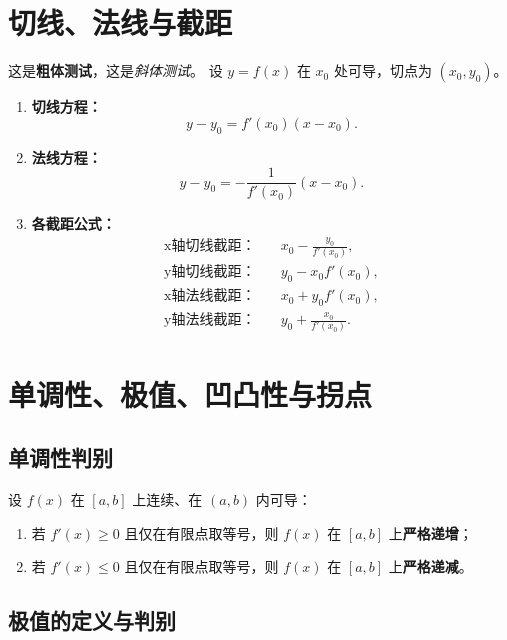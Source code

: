 
\section{切线、法线与截距}
\DTwoTwo
这是\textbf{粗体测试}，这是\textit{斜体测试}。
设 $y = f(x)$ 在 $x_0$ 处可导，切点为 $(x_0, y_0)$。

\begin{enumerate}
    \item \textbf{切线方程：}
          \[
              y - y_0 = f'(x_0)(x - x_0).
          \]
    \item \textbf{法线方程：}
          \[
              y - y_0 = -\frac{1}{f'(x_0)}(x - x_0).
          \]
    \item \textbf{各截距公式：}
          \[
              \begin{aligned}
                  \text{x轴切线截距：} & \quad x_0 - \frac{y_0}{f'(x_0)}, \\
                  \text{y轴切线截距：} & \quad y_0 - x_0 f'(x_0),         \\
                  \text{x轴法线截距：} & \quad x_0 + y_0 f'(x_0),         \\
                  \text{y轴法线截距：} & \quad y_0 + \frac{x_0}{f'(x_0)}.
              \end{aligned}
          \]
\end{enumerate}


\section{单调性、极值、凹凸性与拐点}
\DTwoTwo
\subsection{单调性判别}

设 $f(x)$ 在 $[a,b]$ 上连续、在 $(a,b)$ 内可导：
\begin{enumerate}
    \item 若 $f'(x) \ge 0$ 且仅在有限点取等号，则 $f(x)$ 在 $[a,b]$ 上\textbf{严格递增}；
    \item 若 $f'(x) \le 0$ 且仅在有限点取等号，则 $f(x)$ 在 $[a,b]$ 上\textbf{严格递减}。
\end{enumerate}

\subsection{极值的定义与判别}

